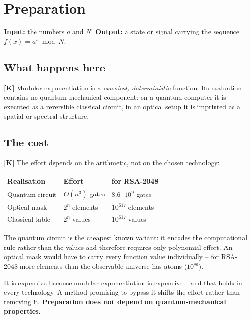 \section{Preparation}
\label{sec:aufbereitung}

\textbf{Input:} the numbers $a$ and $N$.
\textbf{Output:} a state or signal carrying the sequence
$f(x) = a^x \bmod N$.

\subsection{What happens here}

\textbf{[K]} Modular exponentiation is a \emph{classical,
deterministic} function. Its evaluation contains no quantum-mechanical
component: on a quantum computer it is executed as a reversible
classical circuit, in an optical setup it is imprinted as a spatial or
spectral structure.

\subsection{The cost}

\textbf{[K]} The effort depends on the arithmetic, not on the chosen
technology:

\begin{center}
\begin{tabular}{lll}
\toprule
Realisation & Effort & for RSA-2048 \\
\midrule
Quantum circuit & $O(n^3)$ gates & $8.6\cdot10^{9}$ gates \\
Optical mask & $2^n$ elements & $10^{617}$ elements \\
Classical table & $2^n$ values & $10^{617}$ values \\
\bottomrule
\end{tabular}
\end{center}

The quantum circuit is the cheapest known variant: it encodes the
computational rule rather than the values and therefore requires only
polynomial effort. An optical mask would have to carry every function
value individually -- for RSA-2048 more elements than the observable
universe has atoms ($10^{80}$).

\begin{keyresult}
It is expensive because modular exponentiation is expensive -- and that
holds in every technology. A method promising to bypass it shifts the
effort rather than removing it. \textbf{Preparation does not depend on
quantum-mechanical properties.}
\end{keyresult}

